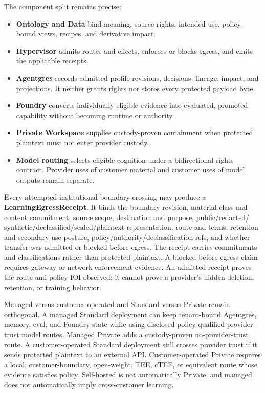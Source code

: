 \documentclass[
  11pt,
]{article}
\providecommand{\tightlist}{%
  \setlength{\itemsep}{0pt}\setlength{\parskip}{0pt}}
\begin{document}
The component split remains precise:

\begin{itemize}
\tightlist
\item
  \textbf{Ontology and Data} bind meaning, source rights, intended use,
  policy-bound views, recipes, and derivative impact.
\item
  \textbf{Hypervisor} admits routes and effects, enforces or blocks egress, and
  emits the applicable receipts.
\item
  \textbf{Agentgres} records admitted profile revisions, decisions, lineage,
  impact, and projections. It neither grants rights nor stores every protected
  payload byte.
\item
  \textbf{Foundry} converts individually eligible evidence into evaluated,
  promoted capability without becoming runtime or authority.
\item
  \textbf{Private Workspace} supplies custody-proven containment when protected
  plaintext must not enter provider custody.
\item
  \textbf{Model routing} selects eligible cognition under a bidirectional rights
  contract. Provider uses of customer material and customer uses of model
  outputs remain separate.
\end{itemize}

Every attempted institutional-boundary crossing may produce a
\textbf{LearningEgressReceipt}. It binds the boundary revision, material class
and content commitment, source scope, destination and purpose, public/redacted/
synthetic/declassified/sealed/plaintext representation, route and terms,
retention and secondary-use posture, policy/authority/declassification refs,
and whether transfer was admitted or blocked before egress. The receipt carries
commitments and classifications rather than protected plaintext. A
blocked-before-egress claim requires gateway or network enforcement evidence.
An admitted receipt proves the route and policy IOI observed; it cannot prove a
provider's hidden deletion, retention, or training behavior.

Managed versus customer-operated and Standard versus Private remain orthogonal.
A managed Standard deployment can keep tenant-bound Agentgres, memory, eval,
and Foundry state while using disclosed policy-qualified provider-trust model
routes. Managed Private adds a custody-proven no-provider-trust route. A
customer-operated Standard deployment still crosses provider trust if it sends
protected plaintext to an external API. Customer-operated Private requires a
local, customer-boundary, open-weight, TEE, cTEE, or equivalent route whose
evidence satisfies policy. Self-hosted is not automatically Private, and
managed does not automatically imply cross-customer learning.
\end{document}
